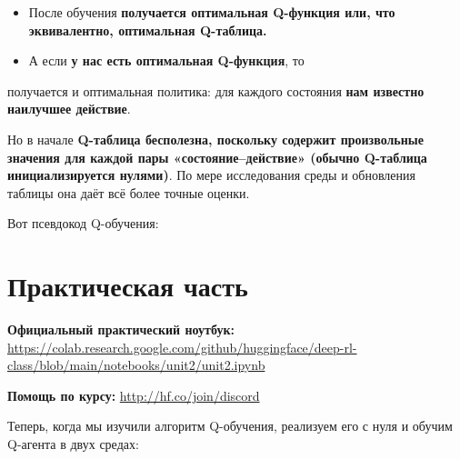 \documentclass[11pt,a4paper]{article}
\begin{document}

\begin{itemize}
\item
  После обучения \textbf{получается оптимальная Q-функция или, что эквивалентно, оптимальная Q-таблица.}
\item
  А если \textbf{у нас есть оптимальная Q-функция}, то
\end{itemize}

получается и оптимальная политика: для каждого состояния \textbf{нам известно наилучшее действие}.


Но в начале \textbf{Q-таблица бесполезна, поскольку содержит произвольные значения для каждой пары «состояние--действие» (обычно Q-таблица инициализируется нулями)}. По мере исследования среды и обновления таблицы она даёт всё более точные оценки.


Вот псевдокод Q-обучения:


\section{Практическая часть}\label{hands-on}

\textbf{Официальный практический ноутбук:} \url{https://colab.research.google.com/github/huggingface/deep-rl-class/blob/main/notebooks/unit2/unit2.ipynb}

\textbf{Помощь по курсу:} \url{http://hf.co/join/discord}

Теперь, когда мы изучили алгоритм Q-обучения, реализуем его с нуля и обучим Q-агента в двух средах:
\end{document}
